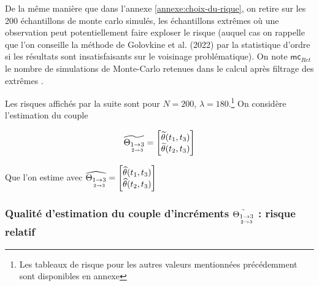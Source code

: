 \noindent De la même manière que dans l'annexe \ref{annexe:choix-du-rique}, on retire sur les 200 échantillons de monte carlo simulés, les échantillons \og extrêmes \fg où une observation peut potentiellement faire exploser le risque (auquel cas on rappelle que l'on conseille la méthode de Golovkine et al. (2022) par la statistique d'ordre si les résultats sont insatisfaisants sur le voisinage problématique). On note $\textsf{mc}_{Ret}$ le nombre de simulations de Monte-Carlo retenues dans le calcul après filtrage des \og extrêmes \fg.

\bigskip

\noindent Les risques affichés par la suite sont pour $N=200$, $\lambda = 180$.\footnote{Les tableaux de risque pour les autres valeurs mentionnées précédemment sont disponibles en annexe} On considère l'estimation du couple

\begin{minipage}{0.45\textwidth}
	\begin{equation*}
		\widetilde {\Theta_{\underset{2 \rightarrow 3}{1 \rightarrow 3}}} = \begin{bmatrix} \widetilde \theta(t_1, t_3)\\ \widetilde \theta(t_2, t_3) \end{bmatrix}
	\end{equation*}
\end{minipage}
\begin{minipage}{0.45\textwidth}
	Que l'on estime avec $\widehat {\Theta_{\underset{2 \rightarrow 3}{1 \rightarrow 3}}} = \begin{bmatrix} \widehat \theta(t_1, t_3)\\ \widehat \theta(t_2, t_3) \end{bmatrix}$
\end{minipage}

\bigskip

\subsubsection{Qualité d'estimation du couple d'incréments $\tilde {\Theta_{\underset{2 \rightarrow 3}{1 \rightarrow 3}}}$ : risque relatif}


